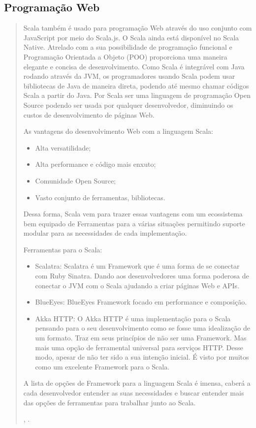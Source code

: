 \subsection{ Programa\c{c}\~{a}o Web}
\begin{quote}
Scala também é usado para programação Web através do uso conjunto com JavaScript por meio do Scala.js. O Scala ainda está disponível no Scala Native. Atrelado com a sua possibilidade  de programação funcional e Programação Orientada a Objeto (POO) proporciona uma maneira elegante e concisa de desenvolvimento. Como Scala é integrável com Java rodando através da JVM, os programadores usando Scala podem usar bibliotecas de Java de maneira direta, podendo até mesmo chamar códigos Scala a partir do Java.
Por Scala ser uma linguagem de programação Open Source podendo ser usada por qualquer desenvolvedor, diminuindo os custos de desenvolvimento de páginas Web.

   As vantagens do desenvolvimento Web com a linguagem Scala:
   \begin{itemize}
      \item Alta versatilidade;
      \item Alta performance e código mais enxuto;
      \item Comunidade Open Source;
      \item Vasto conjunto de ferramentas, bibliotecas.

   \end{itemize}

Dessa forma, Scala vem para trazer essas vantagens com um ecossistema bem equipado de Ferramentas para  a várias situações permitindo suporte modular para as necessidades de cada implementação.

   Ferramentas para o Scala:
   \begin{itemize}
   \item Scalatra: Scalatra é um Framework que é uma forma de se conectar com Ruby Sinatra.  Dando aos desenvolvedores uma forma poderosa de conectar o JVM com o Scala ajudando a criar páginas Web e APIs.
   \item BlueEyes: BlueEyes Framework focado em performance e composição.
   \item Akka HTTP: O Akka HTTP é uma implementação para o Scala pensando para o seu desenvolvimento como se fosse uma idealização de um formato. Traz em seus princípios de não ser uma Framework. Mas mais uma opção de ferramental universal para serviços HTTP. Desse modo, apesar de não ter sido a sua intenção inicial. É visto por muitos como um excelente Framework para o Scala.

   \end{itemize}
   A lista de opções de Framework para a linguagem Scala é imensa, caberá a cada desenvolvedor entender as suas necessidades e buscar entender mais das opções de ferramentas para trabalhar junto ao Scala.


   \cite{Whaling}, \cite{web}.
\end{quote}
